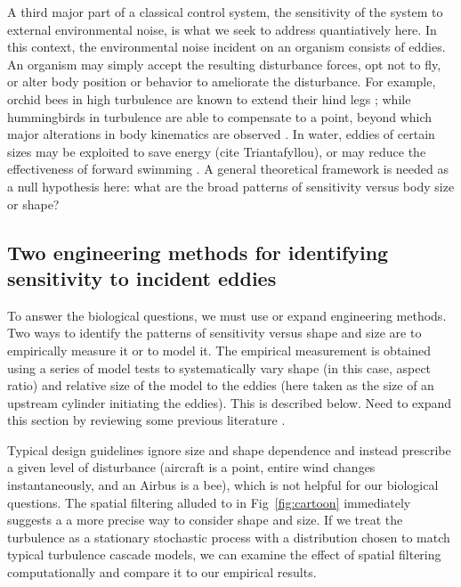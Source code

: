 A third major part of a classical control system, the sensitivity of the system to external environmental noise, is what we seek to address quantiatively here.  In this context, the environmental noise incident on an organism consists of eddies.  An organism may simply accept the resulting disturbance forces, opt not to fly, or alter body position or behavior to ameliorate the disturbance.  For example, orchid bees in high turbulence are known to extend their hind legs \citep{Combes:2009}; while hummingbirds in turbulence are able to compensate to a point, beyond which major alterations in body kinematics are observed \citep{Ortega:2012x}.  In water, eddies of certain sizes may be exploited to save energy (cite Triantafyllou), or may reduce the effectiveness of forward swimming \citep{Webb:2010}.  A general theoretical framework is needed as a null hypothesis here: what are the broad patterns of sensitivity versus body size or shape?  

\subsection{Two engineering methods for identifying sensitivity to incident eddies}
To answer the biological questions, we must use or expand engineering methods.  Two ways to identify the patterns of sensitivity versus shape and size are to empirically measure it or to model it.  The empirical measurement is obtained using a series of model tests to systematically vary shape (in this case, aspect ratio) and relative size of the model to the eddies (here taken as the size of an upstream cylinder initiating the eddies). This is described below.  Need to expand this section by reviewing some previous literature  \citep{Fox:2010, Marmarelis:1977, Marmarelis:1993}.


Typical design guidelines \citep{navair:1996} ignore size and shape dependence and instead prescribe a given level of disturbance (aircraft is a point, entire wind changes instantaneously, and an Airbus is a bee), which is not helpful for our biological questions. The spatial filtering alluded to in Fig~\ref{fig:cartoon} immediately suggests a a more precise way to consider shape and size. If we treat the turbulence as a stationary stochastic process with a distribution chosen to match typical turbulence cascade models, we can examine the effect of spatial filtering computationally and compare it to our empirical results. 









